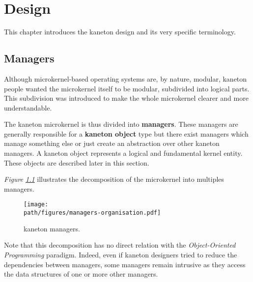 %
%
%
%
%
%

%
%

\chapter{Design}
\label{chapter:design}

This chapter introduces the kaneton design and its very specific terminology.

\newpage

%
%

%
%

\section{Managers}

Although microkernel-based operating systems are, by nature, modular, kaneton
people wanted the microkernel itself to be modular, subdivided into logical
parts. This subdivision was introduced to make the whole microkernel clearer
and more understandable.

The kaneton microkernel is thus divided into \textbf{managers}. These
managers are generally responsible for a \textbf{kaneton object} type but there
exist managers which manage something else or just create an abstraction over
other kaneton managers. A kaneton object represents a logical and fundamental
kernel entity. These objects are described later in this section.

\textit{Figure \ref{figure:managers-organisation}} illustrates the
decomposition of the microkernel into multiples managers.

\begin{figure}[h]
  \begin{center}
    \texttt{[image: \\path/figures/managers-organisation.pdf]}
    \caption{kaneton managers.}
    \label{figure:managers-organisation}
  \end{center}
\end{figure}

Note that this decomposition has no direct relation with the
\textit{Object-Oriented Programming} paradigm. Indeed, even if kaneton
designers tried to reduce the dependencies between managers, some managers
remain intrusive as they access the data structures of one or more other
managers.

